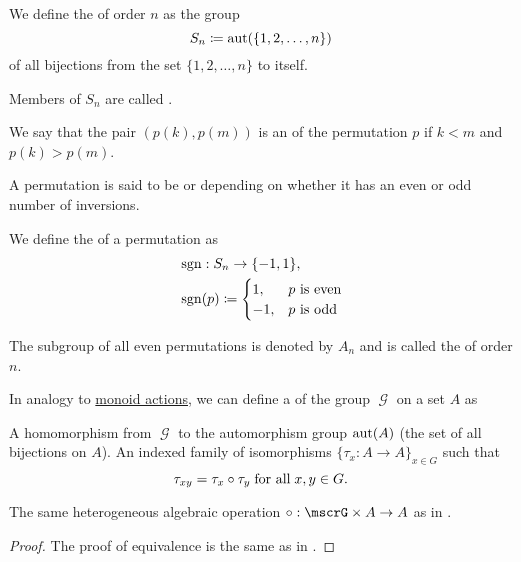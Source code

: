 \begin{definition}\label{def:symmetric_group}
  We define the  of order \( n \) as the group
  \begin{equation*}
    S_n \coloneqq \operatorname{aut}(\{ 1, 2, \ldots, n \})
  \end{equation*}
  of all bijections from the set \( \{ 1, 2, \ldots, n \} \) to itself.

  \begin{thmenum}
     Members of \( S_n \) are called .

     We say that the pair \( (p(k), p(m)) \) is an  of the permutation \( p \) if \( k < m \) and \( p(k) > p(m) \).

     A permutation is said to be  or  depending on whether it has an even or odd number of inversions.

     We define the  of a permutation as
    \begin{align*}
       &\operatorname{sgn}: S_n \to \{ -1, 1 \}, \\
       &\operatorname{sgn}(p) \coloneqq \begin{cases}
        1,  &p \text{ is even} \\
        -1, &p \text{ is odd}
      \end{cases}
    \end{align*}

     The subgroup of all even permutations is denoted by \( A_n \) and is called the  of order \( n \).
  \end{thmenum}
\end{definition}

\begin{definition}\label{def:left_group_action}
  In analogy to \hyperref[def:left_monoid_action]{monoid actions}, we can define a  of the group \( \mscrG \) on a set \( A \) as
  \begin{thmenum}
     A homomorphism from \( \mscrG \) to the automorphism group \( \operatorname{aut}(A) \) (the set of all bijections on \( A \)).
     An indexed family of isomorphisms \( \{ \tau_x: A \to A \}_{x \in G} \) such that
    \begin{equation}\label{eq:def:left_group_action/indirect_homomorphism}
      \tau_{xy} = \tau_x \bincirc \tau_y \T{for all} x, y \in G.
    \end{equation}

     The same heterogeneous algebraic operation \( \bincirc: \mscrG \times A \to A \) as in .
  \end{thmenum}
\end{definition}
\begin{proof}
  The proof of equivalence is the same as in .
\end{proof}

